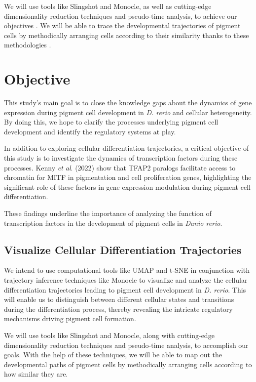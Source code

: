 \documentclass[runningheads]{llncs}
\begin{document}
We will use tools like Slingshot and Monocle, as well as cutting-edge dimensionality reduction techniques and pseudo-time analysis, to achieve our objectives \cite{qiu2017reversed,street2018slingshot}. We will be able to trace the developmental trajectories of pigment cells by methodically arranging cells according to their similarity thanks to these methodologies \cite{nayak2021hitchhiker,kulkarni2019beyond}.

\section{Objective}
This study's main goal is to close the knowledge gaps about the dynamics of gene expression during pigment cell development in \textit{D. rerio} and cellular heterogeneity. By doing this, we hope to clarify the processes underlying pigment cell development and identify the regulatory systems at play.

In addition to exploring cellular differentiation trajectories, a critical objective of this study is to investigate the dynamics of transcription factors during these processes. Kenny \textit{et al}. (2022) show that TFAP2 paralogs facilitate access to chromatin for MITF in pigmentation and cell proliferation genes, highlighting the significant role of these factors in gene expression modulation during pigment cell differentiation. 

These findings underline the importance of analyzing the function of transcription factors in the development of pigment cells in \textit{Danio rerio}.

\subsection{Visualize Cellular Differentiation Trajectories}
We intend to use computational tools like UMAP and t-SNE in conjunction with trajectory inference techniques like Monocle \cite{qiu2017reversed} to visualize and analyze the cellular differentiation trajectories leading to pigment cell development in \textit{D. rerio}. This will enable us to distinguish between different cellular states and transitions during the differentiation process, thereby revealing the intricate regulatory mechanisms driving pigment cell formation.

We will use tools like Slingshot \cite{street2018slingshot} and Monocle, along with cutting-edge dimensionality reduction techniques and pseudo-time analysis, to accomplish our goals. With the help of these techniques, we will be able to map out the developmental paths of pigment cells by methodically arranging cells according to how similar they are. 
\end{document}
